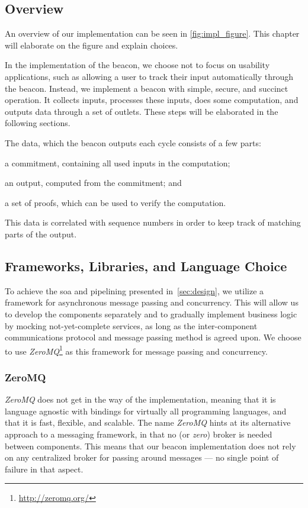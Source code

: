 \subsection{Overview}%
\label{sub:overview}
An overview of our implementation can be seen in \vref{fig:impl_figure}. This chapter will elaborate on the figure and explain choices.

In the implementation of the beacon, we choose not to focus on usability applications, such as allowing a user to track their input automatically through the beacon.
Instead, we implement a beacon with simple, secure, and succinct operation.
It collects inputs, processes these inputs, does some computation, and outputs data through a set of outlets.
These steps will be elaborated in the following sections.

The data, which the beacon outputs each cycle consists of a few parts:
\begin{eletterate*}
\item a commitment, containing all used inputs in the computation;
\item an output, computed from the commitment; and
\item a set of proofs, which can be used to verify the computation.
\end{eletterate*}
This data is correlated with sequence numbers in order to keep track of matching parts of the output.

\subsection{Frameworks, Libraries, and Language Choice}
To achieve the \acrfull{soa} and pipelining presented in~\cref{sec:design}, we utilize a framework for asynchronous message passing and concurrency.
This will allow us to develop the components separately and to gradually implement business logic by mocking not-yet-complete services, as long as the inter-component communications protocol and message passing method is agreed upon.
We choose to use \textit{ZeroMQ}\footnote{\url{http://zeromq.org/}} as this framework for message passing and concurrency.

\subsubsection{ZeroMQ}
\textit{ZeroMQ} does not get in the way of the implementation, meaning that it is language agnostic with bindings for virtually all programming languages, and that it is fast, flexible, and scalable.
The name \textit{ZeroMQ} hints at its alternative approach to a messaging framework, in that no (or \textit{zero}) broker is needed between components.
This means that our beacon implementation does not rely on any centralized broker for passing around messages --- no single point of failure in that aspect.

